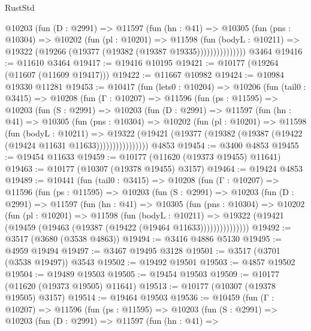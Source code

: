 \begin{lexlean}{RustStd}
\begin{coremodule}
              @10203
                (fun (D : @2991) =>
                @11597
                  (fun (hn : @41) =>
                  @10305
                    (fun (pns : @10304) =>
                    @10202
                      (fun (pl : @10201) =>
                      @11598
                        (fun (bodyL : @10211) =>
                        @19322 (@19266 (@19377 (@19382 (@19387 @19335)))))))))))))))
    @3464
@19416 := @11610 @3464
@19417 := @19416 @10195
@19421 := @10177 (@19264 (@11607 (@11609 @19417)))
@19422 := @11667 @10982
@19424 := @10984 @19330 @11281
@19453 := @10417
    (fun (lets0 : @10204) =>
    @10206
      (fun (tail0 : @3415) =>
      @10208
        (fun (Γ : @10207) =>
        @11596
          (fun (ps : @11595) =>
          @10203
            (fun (S : @2991) =>
            @10203
              (fun (D : @2991) =>
              @11597
                (fun (hn : @41) =>
                @10305
                  (fun (pns : @10304) =>
                  @10202
                    (fun (pl : @10201) =>
                    @11598
                      (fun (bodyL : @10211) =>
                      @19322
                        (@19421
                          (@19377 (@19382 (@19387 (@19422 (@19424 @11631 @11633))))))))))))))))
    @4853
@19454 := @3400 @4853
@19455 := @19454 @11633
@19459 := @10177 (@11620 (@19373 @19455) @11641)
@19463 := @10177 (@10307 (@19378 @19455) @3157)
@19464 := @19424 @4853
@19489 := @10441
    (fun (tail0 : @3415) =>
    @10208
      (fun (Γ : @10207) =>
      @11596
        (fun (ps : @11595) =>
        @10203
          (fun (S : @2991) =>
          @10203
            (fun (D : @2991) =>
            @11597
              (fun (hn : @41) =>
              @10305
                (fun (pns : @10304) =>
                @10202
                  (fun (pl : @10201) =>
                  @11598
                    (fun (bodyL : @10211) =>
                    @19322 (@19421 (@19459 (@19463 (@19387 (@19422 (@19464 @11633)))))))))))))))
@19492 := @3517 (@3680 (@3538 @4863))
@19494 := @3416 @4886 @5130
@19495 := @4959 @19494
@19497 := @3467 @19495 @3128
@19501 := @3517 (@3701 (@3538 @19497)) @3543
@19502 := @19492 @19501
@19503 := @4857 @19502
@19504 := @19489 @19503
@19505 := @19454 @19503
@19509 := @10177 (@11620 (@19373 @19505) @11641)
@19513 := @10177 (@10307 (@19378 @19505) @3157)
@19514 := @19464 @19503
@19536 := @10459
    (fun (Γ : @10207) =>
    @11596
      (fun (ps : @11595) =>
      @10203
        (fun (S : @2991) =>
        @10203
          (fun (D : @2991) =>
          @11597
            (fun (hn : @41) =>

\end{coremodule}
\end{lexlean}
